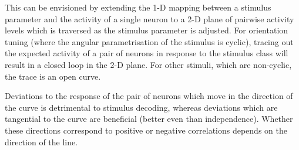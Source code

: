 This can be envisioned by extending the 1-D mapping between a stimulus parameter and the activity of a single neuron to a 2-D plane of pairwise activity levels which is traversed as the stimulus parameter is adjusted. For orientation tuning (where the angular parametrisation of the stimulus is cyclic), tracing out the expected activity of a pair of neurons in response to the stimulus class will result in a closed loop in the 2-D plane. For other stimuli, which are non-cyclic, the trace is an open curve.

Deviations to the response of the pair of neurons which move in the direction of the curve is detrimental to stimulus decoding, whereas deviations which are tangential to the curve are beneficial (better even than independence). Whether these directions correspond to positive or negative correlations depends on the direction of the line.
